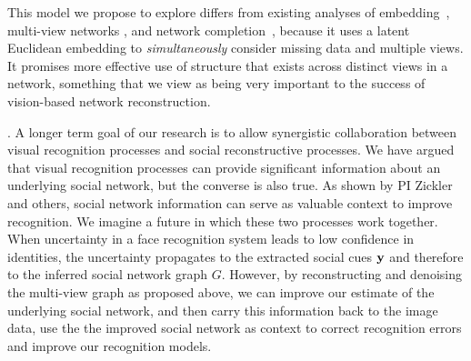 This model we propose to explore differs from existing analyses of embedding~\cite{Hoff01latentspace,Hancocklatent}, multi-view networks \cite{AiroldiBFX08,Kim12}, and network completion~\cite{Clauset,Guimera,HannekeX09,KimL11}, because it uses a latent Euclidean embedding to \emph{simultaneously} consider missing data and multiple views. It promises more effective use of structure that exists across distinct views in a network, something that we view as being very important to the success of vision-based network reconstruction. 


\label{sec:closeloop}

. A longer term goal of our research is to allow synergistic collaboration between visual recognition processes and social reconstructive processes. We have argued that visual recognition processes can provide significant information about an underlying social network, but the converse is also true. As shown by PI Zickler~\cite{Stone2008,Stone2010} and others, social network information can serve as valuable context to improve recognition. We imagine a future in which these two processes work together. When uncertainty in a face recognition system leads to low confidence in identities, the uncertainty propagates to the extracted social cues ${\bf y}$ and therefore to the inferred social network graph $G$. However, by reconstructing and denoising the multi-view graph as proposed above, we can improve our estimate of the underlying social network, and then carry this information back to the image data, use the the improved social network as context to correct recognition errors and improve our recognition models.
